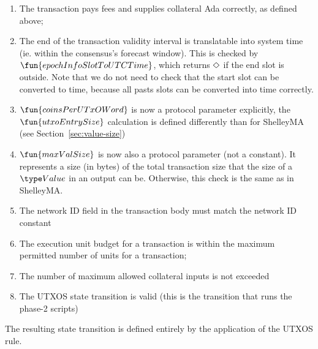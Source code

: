 \begin{enumerate}
  \item The transaction pays fees and supplies collateral Ada correctly, as defined above;

  \item The end of the transaction validity interval is translatable into
  system time (ie. within the consensus's forecast window). This is checked
  by $\fun{epochInfoSlotToUTCTime}$, which returns $\Diamond$ if the end slot is outside.
  Note that we do not need to check that the start slot can be converted to
  time, because all pasts slots can be converted into time correctly.

  \item $\fun{coinsPerUTxOWord}$ is now a protocol parameter explicitly, the
  $\fun{utxoEntrySize}$ calculation is defined differently than for ShelleyMA
  (see Section~\ref{sec:value-size})

  \item $\fun{maxValSize}$ is now also a protocol parameter (not a constant).
  It represents a size (in bytes) of the total transaction
  size that the size of a $\Value$ in an output can be. Otherwise, this check is
  the same as in ShelleyMA.

  \item The network ID field in the transaction body must match the
  network ID constant

 \item The execution unit budget for a transaction is within the maximum
  permitted number of units for a transaction;

  \item The number of maximum allowed collateral inputs is not exceeded

  \item The UTXOS state transition is valid (this is the transition that runs the
  phase-2 scripts)
\end{enumerate}

The resulting state transition is defined entirely by the application of the
UTXOS rule.

